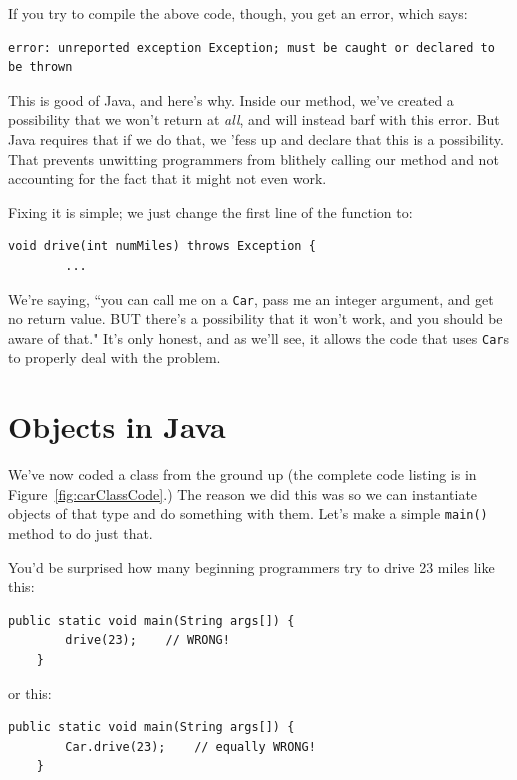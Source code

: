 If you try to compile the above code, though, you get an error, which says:

\begin{Verbatim}[samepage=true,fontsize=\small]
error: unreported exception Exception; must be caught or declared to be thrown
\end{Verbatim}

This is good of Java, and here's why. Inside our method, we've created a
possibility that we won't return at \textit{all}, and will instead barf with
this error. But Java requires that if we do that, we 'fess up and declare that
this is a possibility. That prevents unwitting programmers from blithely
calling our method and not accounting for the fact that it might not even
work.

Fixing it is simple; we just change the first line of the function to:

\begin{Verbatim}[samepage=true,fontsize=\footnotesize,frame=single]
    void drive(int numMiles) throws Exception {
        ...
\end{Verbatim}

We're saying, ``you can call me on a \texttt{Car}, pass me an integer
argument, and get no return value. BUT there's a possibility that it won't
work, and you should be aware of that." It's only honest, and as we'll see, it
allows the code that uses \texttt{Car}s to properly deal with the problem.



\section{Objects in Java}

We've now coded a class from the ground up (the complete code listing is in
Figure~\ref{fig:carClassCode}.) The reason we did this was so we can
instantiate objects of that type and do something with them. Let's make a
simple \texttt{main()} method to do just that.

You'd be surprised how many beginning programmers try to drive 23 miles like
this:

\begin{Verbatim}[samepage=true,fontsize=\footnotesize,frame=single]
    public static void main(String args[]) {
        drive(23);    // WRONG!
    }
\end{Verbatim}

or this:

\begin{Verbatim}[samepage=true,fontsize=\footnotesize,frame=single]
    public static void main(String args[]) {
        Car.drive(23);    // equally WRONG!
    }
\end{Verbatim}

